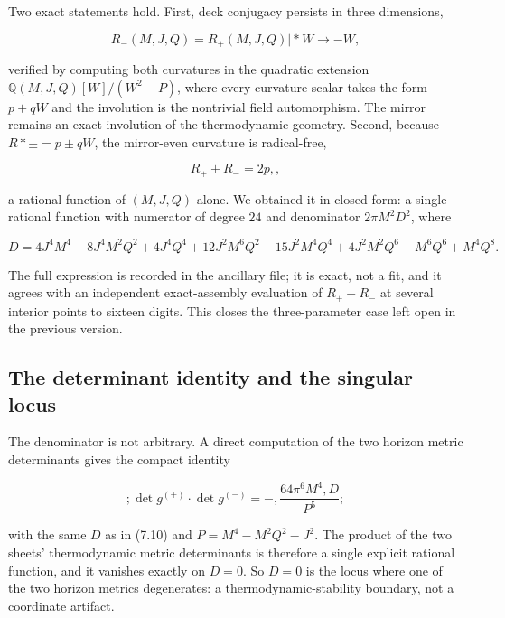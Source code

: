\documentclass[11pt]{article}
\begin{document}
Two exact statements hold. First, deck conjugacy persists in three dimensions,

\begin{equation*}
R_-(M,J,Q) = R_+(M,J,Q)\big|*{W \to -W},
\tag{7.8}
\end{equation*}

verified by computing both curvatures in the quadratic extension $\mathbb{Q}(M,J,Q)[W]/(W^2 - P)$, where every curvature scalar takes the form $p + qW$ and the involution is the nontrivial field automorphism. The mirror remains an exact involution of the thermodynamic geometry. Second, because $R*\pm = p \pm qW$, the mirror-even curvature is radical-free,

\begin{equation*}
R_+ + R_- = 2p, ,
\tag{7.9}
\end{equation*}

a rational function of $(M,J,Q)$ alone. We obtained it in closed form: a single rational function with numerator of degree $24$ and denominator $2\pi M^2 D^2$, where

\begin{equation*}
D = 4J^4M^4 - 8J^4M^2Q^2 + 4J^4Q^4 + 12J^2M^6Q^2 - 15J^2M^4Q^4 + 4J^2M^2Q^6 - M^6Q^6 + M^4Q^8 .
\tag{7.10}
\end{equation*}

The full expression is recorded in the ancillary file; it is exact, not a fit, and it agrees with an independent exact-assembly evaluation of $R_+ + R_-$ at several interior points to sixteen digits. This closes the three-parameter case left open in the previous version.

\subsection{The determinant identity and the singular locus}

The denominator is not arbitrary. A direct computation of the two horizon metric determinants gives the compact identity

\begin{equation*}
\boxed{;\det g^{(+)} \cdot \det g^{(-)} = -,\frac{64\pi^6 M^4, D}{P^5};}
\tag{7.11}
\end{equation*}

with the same $D$ as in (7.10) and $P = M^4 - M^2Q^2 - J^2$. The product of the two sheets' thermodynamic metric determinants is therefore a single explicit rational function, and it vanishes exactly on $D = 0$. So $D = 0$ is the locus where one of the two horizon metrics degenerates: a thermodynamic-stability boundary, not a coordinate artifact.
\end{document}
